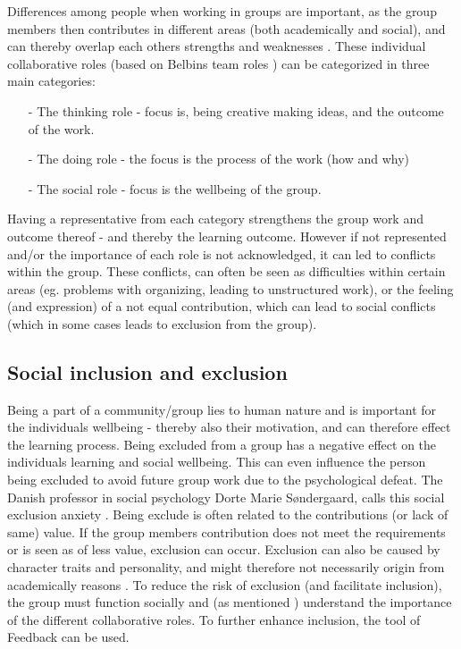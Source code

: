 Differences among people when working in groups are important, as the group members then contributes in different areas (both academically and social), and can thereby overlap each others strengths and weaknesses \cite{ProjektarbejdesKompleksitet}. These individual collaborative roles (based on Belbins team roles \cite{ProjektarbejdesKompleksitet}) can be categorized in three main categories: 
\begin{itemize}
	\item[-] The thinking role - focus is, being creative making ideas, and the outcome of the work. 
	\item[-] The doing role - the focus is the process of the work (how and why)
	\item[-] The social role - focus is the wellbeing of the group. 
\end{itemize}

Having a representative from each category strengthens the group work and outcome thereof - and thereby the learning outcome\cite{ProjektarbejdesKompleksitet}. However if not represented and/or the importance of each role is not acknowledged, it can led to conflicts within the group. These conflicts, can often be seen as difficulties within certain areas (eg. problems with organizing, leading to unstructured work), or the feeling (and expression) of a not equal contribution, which can lead to social conflicts (which in some cases leads to exclusion from the group)\cite{ProjektarbejdesKompleksitet}. 

\subsection{Social inclusion and exclusion}
Being a part of a community/group lies to human nature and is important for the individuals wellbeing  \cite{ProjektarbejdesKompleksitet}- thereby also their motivation, and can therefore effect the learning process. Being excluded from a group has a negative effect on the individuals learning and social wellbeing. This can even influence the person being excluded to avoid future group work due to the psychological defeat.   The Danish professor in social psychology Dorte Marie Søndergaard, calls this  social exclusion anxiety \cite{ProjektarbejdesKompleksitet}. Being exclude is often related to the contributions (or lack of same) value. If the group members contribution does not meet the requirements or is seen as of less value, exclusion can occur. Exclusion can also be caused by character traits and personality, and might therefore not necessarily origin from academically reasons \cite{ProjektarbejdesKompleksitet}.
To reduce the risk of exclusion (and facilitate inclusion), the group must function socially and (as mentioned ) understand the importance of the different collaborative roles. To further enhance inclusion, the tool of Feedback can be used. 

